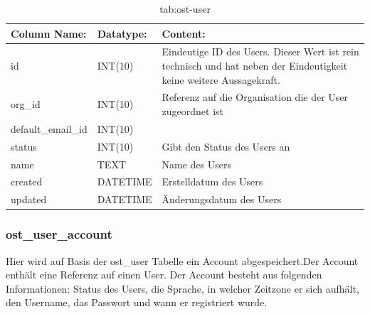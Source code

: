 \begin{table}[h]
	\begin{tabular}{|p{3.5cm}|p{4cm}|p{6.2cm}|}
		\hline
		\textbf{Column Name:} & \textbf{Datatype:} & \textbf{Content:}\\
		\hline
		id & INT(10) & Eindeutige ID des Users. Dieser Wert ist rein technisch und hat  neben der Eindeutigkeit keine weitere 
		Aussagekraft.\\
		\hline
		org\_id & INT(10) & Referenz auf die Organisation die der User zugeordnet ist\\
		\hline
		default\_email\_id& INT(10) & \\
		\hline
		status & INT(10) & Gibt den Status des Users an\\
		\hline
		name & TEXT & Name des Users\\
		\hline
		created & DATETIME & Erstelldatum des Users\\
		\hline
		updated & DATETIME & Änderungsdatum des Users\\
		\hline
		
	\end{tabular}
	\caption{tab:ost-user}
\end{table}
\label{tab:ost_user}

\newpage

\subsubsection{ost\_user\_account}

Hier wird auf Basis der ost\_user Tabelle ein Account abgespeichert.Der Account enthält eine Referenz auf einen User. Der Account besteht aus folgenden Informationen: Status des Users, die Sprache, in welcher Zeitzone er sich aufhält, den Username, das Passwort und wann er registriert wurde.

